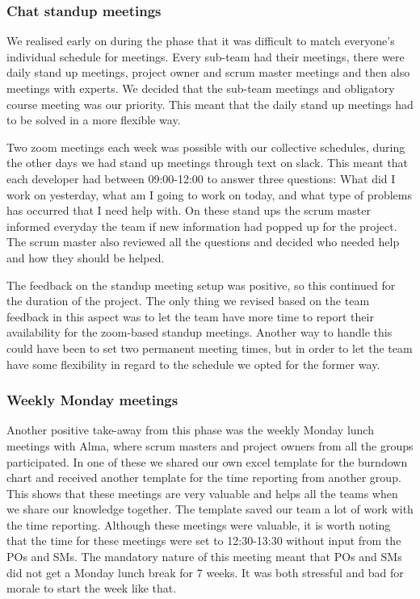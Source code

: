 \documentclass{article}
\begin{document}
\subsubsection{Chat standup meetings}
We realised early on during the phase that it was difficult to match everyone's individual schedule for meetings. Every sub-team had their meetings, there were daily stand up meetings, project owner and scrum master meetings and then also meetings with experts. We decided that the sub-team meetings and obligatory course meeting was our priority. This meant that the daily stand up meetings had to be solved in a more flexible way. 

Two zoom meetings each week was possible with our collective schedules, during the other days we had stand up meetings through text on slack. This meant that each developer had between 09:00-12:00 to answer three questions: What did I work on yesterday, what am I going to work on today, and what type of problems has occurred that I need help with. On these stand ups the scrum master informed everyday the team if new information had popped up for the project. The scrum master also reviewed all the questions and decided who needed help and how they should be helped. 

The feedback on the standup meeting setup was positive, so this continued for the duration of the project. The only thing we revised based on the team feedback in this aspect was to let the team have more time to report their availability for the zoom-based standup meetings. Another way to handle this could have been to set two permanent meeting times, but in order to let the team have some flexibility in regard to the schedule we opted for the former way. 

\subsubsection{Weekly Monday meetings}
Another positive take-away from this phase was the weekly Monday lunch meetings with Alma, where scrum masters and project owners from all the groups participated. In one of these we shared our own excel template for the burndown chart and received another template for the time reporting from another group. This shows that these meetings are very valuable and helps all the teams when we share our knowledge together. The template saved our team a lot of work with the time reporting. Although these meetings were valuable, it is worth noting that the time for these meetings were set to 12:30-13:30 without input from the POs and SMs. The mandatory nature of this meeting meant that POs and SMs did not get a Monday lunch break for 7 weeks. 
It was both stressful and bad for morale to start the week like that.
\end{document}
